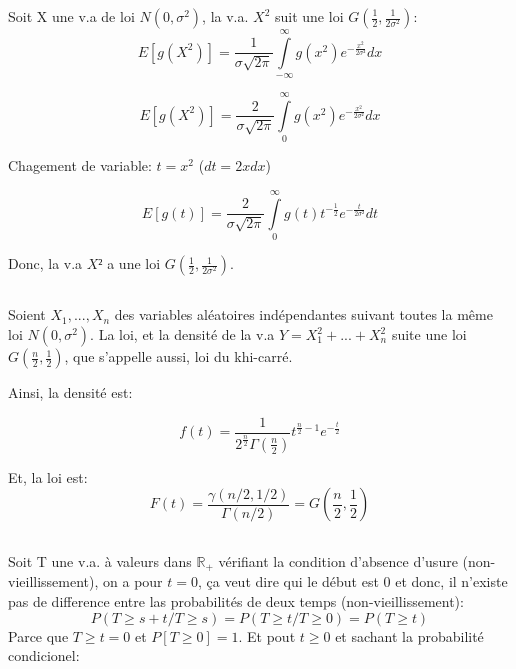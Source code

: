 \documentclass[a4paper]{article}
\begin{document}
Soit X une v.a de loi $N(0,\sigma^2)$, la v.a. $X^2$ suit une loi $G(\frac{1}{2},\frac{1}{2\sigma^2})$:
\begin{equation}
E[g(X^2)]=\frac{1}{\sigma\sqrt{2\pi}}\int\limits_{-\infty}^\infty g(x^2)e^{-\frac{x^2}{2\sigma²}}dx
\end{equation}

\begin{equation}
E[g(X^2)]=\frac{2}{\sigma\sqrt{2\pi}}\int\limits_{0}^\infty g(x^2)e^{-\frac{x^2}{2\sigma²}}dx
\end{equation}

Chagement de variable: $t=x^2$ ($dt=2xdx$)

\begin{equation}
E[g(t)]=\frac{2}{\sigma\sqrt{2\pi}}\int\limits_{0}^\infty g(t)t^{-\frac{1}{2}}e^{-\frac{t}{2\sigma²}}dt
\end{equation}

Donc, la v.a $X²$ a une loi $G(\frac{1}{2},\frac{1}{2\sigma^2})$.

\subsection{}
Soient $X_1,...,X_n$  des variables  aléatoires indépendantes suivant  toutes la
même loi  $N(0, \sigma^2)$.  La loi,  et la densité  de la  v.a $Y=X_1^2  +... +
X_n^2$ suite une loi $G(\frac{n}{2},\frac{1}{2})$, que s'appelle aussi, loi du khi-carré.

Ainsi, la densité est:

\begin{equation}
f(t)=\frac{1}{2^{\frac{n}{2}}\Gamma(\frac{n}{2})}t^{\frac{n}{2}-1}e^{-\frac{t}{2}}
\end{equation}

Et, la loi est:
\begin{equation}
F(t)=\frac{\gamma(n/2,1/2)}{\Gamma(n/2)}=G(\frac{n}{2},\frac{1}{2}) 
\end{equation}



\subsection{}
\subsubsection{}
Soit T une  v.a. à valeurs dans $\mathbb{R}_+$  vérifiant la condition d'absence
d'usure (non-vieillissement), on  a pour $t=0$, ça veut dire qui  le début est 0
et donc, il n'existe pas de difference entre las probabilités de deux temps (non-vieillissement):
\begin{equation}
P(T\geq s+t/ T \geq s)=P(T\geq t /T\geq 0)=P(T\geq t )
\end{equation}
Parce  que $T\geq  t=0$  et $P[T\geq  0]=1$. Et  pout  $t\geq 0$  et sachant  la
probabilité condicionel:
\end{document}

